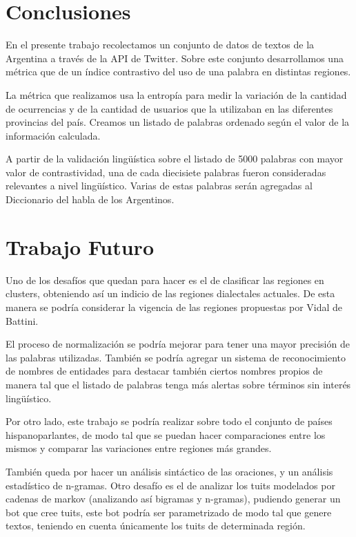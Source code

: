 \section{Conclusiones}
En el presente trabajo recolectamos un conjunto de datos de textos de la Argentina a través de la API de Twitter. Sobre este conjunto desarrollamos una métrica que de un índice contrastivo del uso de una palabra en distintas regiones.

La métrica que realizamos usa la entropía para medir la variación de la cantidad de ocurrencias y de la cantidad de usuarios que la utilizaban en las diferentes provincias del país. Creamos un listado de palabras ordenado según el valor de la información calculada. 

A partir de la validación lingüística sobre el listado de 5000 palabras con mayor valor de contrastividad, una de cada diecisiete palabras fueron consideradas relevantes a nivel lingüístico. Varias de estas palabras serán agregadas al Diccionario del habla de los Argentinos. 

\section{Trabajo Futuro}

Uno de los desafíos que quedan para hacer es el de clasificar las regiones en clusters, obteniendo así un indicio de las regiones dialectales actuales. De esta manera se podría considerar la vigencia de las regiones propuestas por Vidal de Battini. %

El proceso de normalización se podría mejorar para tener una mayor precisión de las palabras utilizadas. También se podría agregar un sistema de reconocimiento de nombres de entidades para destacar también ciertos nombres propios de manera tal que el listado de palabras tenga más alertas sobre términos sin interés lingüístico.

Por otro lado, este trabajo se podría realizar sobre todo el conjunto de países hispanoparlantes, de modo tal que se puedan hacer comparaciones entre los mismos y comparar las variaciones entre regiones más grandes.

También queda por hacer un análisis sintáctico de las oraciones, y un análisis estadístico de n-gramas.
Otro desafío es el de analizar los tuits modelados por cadenas de markov (analizando así bigramas y n-gramas), pudiendo generar un bot que cree tuits, este bot podría ser parametrizado de modo tal que genere textos, teniendo en cuenta únicamente los tuits de determinada región.

